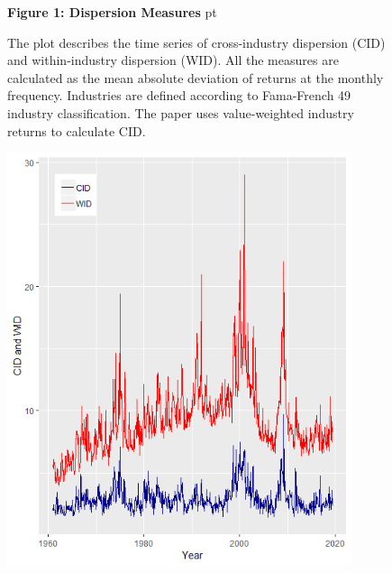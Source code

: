 \documentclass[12pt]{article}
\begin{document}
\begin{figure}[h!]
\textbf{Figure 1: Dispersion Measures}
 pt
\begin{flushleft}
{The plot describes the time series of cross-industry dispersion (CID) and within-industry dispersion (WID). All the measures are calculated as the mean absolute deviation of returns at the monthly frequency. Industries are defined according to Fama-French 49 industry classification. The paper uses value-weighted industry returns to calculate CID.}
\end{flushleft}
\centering
\vspace{0.64cm}
\includegraphics[width=0.9\textwidth]{Figure1.png}
\end{figure}
\end{document}
